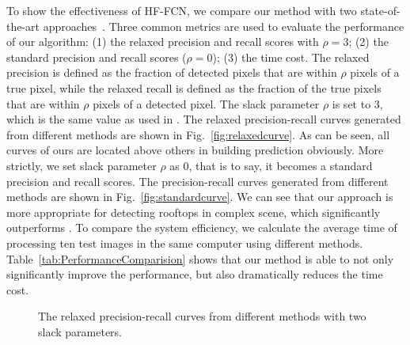 To show the effectiveness of HF-FCN, we compare our method with two state-of-the-art approaches~\cite{Mnih2013Machine,Saito2016Multiple}.
Three common metrics are used to evaluate the performance of our algorithm: (1) the relaxed precision and recall scores with $\rho = 3$; (2) the standard precision and recall scores ($\rho= 0$); (3) the time cost.  
The relaxed precision is defined as the fraction of detected pixels that are within $\rho$ pixels of a true pixel, while the relaxed recall is defined as the fraction of the true pixels that are within $\rho$ pixels of a detected pixel.
%
The slack parameter $\rho$ is set to 3, which is the same value as used in \cite{Mnih2013Machine,Saito2016Multiple}. 
The relaxed precision-recall curves generated from different methods are shown in Fig.~\ref{fig:relaxedcurve}. As can be seen, all curves of ours are located above others in building prediction obviously.
%
More strictly, we set slack parameter $\rho$ as 0, that is to say, it becomes a standard precision and recall scores. 
%
The precision-recall curves generated from different methods are shown in Fig.~\ref{fig:standardcurve}. We can see that our approach is more appropriate for detecting rooftops in complex scene,  which significantly outperforms  \cite{Mnih2013Machine,Saito2016Multiple}.
%
To compare the system efficiency, we calculate the average time of processing ten test images in the same computer using different methods. 
Table~\ref{tab:PerformanceComparision} shows that our method is able to not only significantly improve the performance, but also dramatically reduces the time cost. 
      
\begin{figure}
\centering
{}
\caption{The relaxed precision-recall curves from different methods with two slack parameters.}
\label{fig:}
\end{figure}
 

